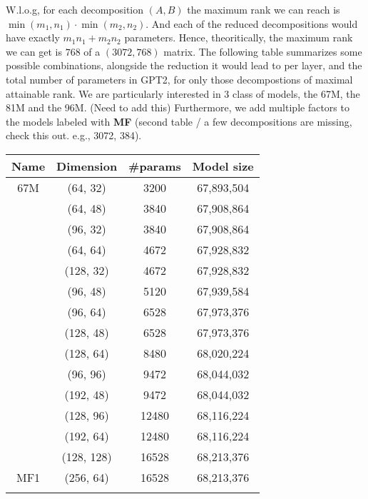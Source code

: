 \documentclass{article}
\begin{document}
{	W.l.o.g, for each decomposition $(A,B)$ the maximum rank we can reach is $\min(m_1,n_1) \cdot \min(m_2,n_2)$. And each of the reduced decompositions would have exactly $m_1 n_1 + m_2 n_2$ parameters. Hence, theoritically, the maximum rank we can get is $768$ of a $(3072, 768)$ matrix. The following table summarizes some possible combinations, alongside the reduction it would lead to per layer, and the total number of parameters in GPT2, for only those decompostions of maximal attainable rank. We are particularly interested in 3 class of models, the 67M, the 81M and the 96M. (Need to add this) Furthermore, we add multiple factors to the models labeled with \textbf{MF} (second table / a few decompositions are missing, check this out. e.g., 3072, 384).
\begin{table}[htb!]
\centering
\begin{tabular}{|c|c|c|c|}
\hline
Name 	& Dimension 		& 	#params 	& Model size\\
\hline
67M		&  (64, 32)         &   3200       & 67,893,504  \\ \hline 
		&  (64, 48)         &   3840       & 67,908,864  \\ \hline 
		&  (96, 32)         &   3840       & 67,908,864  \\ \hline
		&  (64, 64)         &   4672       & 67,928,832  \\ \hline
		&  (128, 32)        &   4672       & 67,928,832  \\ \hline 
		&  (96, 48)         &   5120       & 67,939,584  \\ \hline 
		&  (96, 64)         &   6528       & 67,973,376  \\ \hline
		&  (128, 48)        &   6528       & 67,973,376  \\ \hline
		&  (128, 64)        &   8480       & 68,020,224  \\ \hline 
		&  (96, 96)         &   9472       & 68,044,032  \\ \hline 
 		&  (192, 48)        &   9472       & 68,044,032  \\ \hline
		&  (128, 96)        &   12480      & 68,116,224  \\ \hline
		&  (192, 64)        &   12480      & 68,116,224  \\ \hline 
		&  (128, 128)       &   16528      & 68,213,376  \\ \hline 
MF1		&  (256, 64)        &   16528      & 68,213,376  \\ \hline
		&  \cdots &   \cdots    & \cdots \\ \hline

\end{tabular}
\end{table}}
\end{document}
